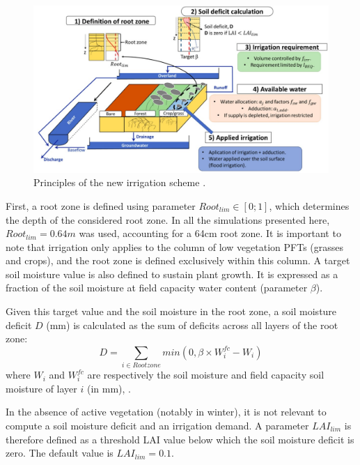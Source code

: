\begin{figure}[t]
    \centering
    \includegraphics[width=1\textwidth]{images/schema_pedro.png}
    \caption{Principles of the new irrigation scheme \citep[from][]{arboleda-obando_validation_2024}.}
    \label{fig:schema_pedro}
\end{figure}

First, a root zone is defined using parameter $Root_{lim} \in [0;1]$, which determines the depth of the considered root zone. In all the simulations presented here, $Root_{lim} = 0.64m$ was used, accounting for a 64cm root zone. It is important to note that irrigation only applies to the column of low vegetation PFTs (grasses and crops), and the root zone is defined exclusively within this column.%
A target soil moisture value is also defined to sustain plant growth. It is expressed as a fraction of the soil moisture at field capacity water content (parameter $\beta$).

Given this target value and the soil moisture in the root zone, a soil moisture deficit $D$ (mm) is calculated as the sum of deficits across all layers of the root zone:
\begin{equation}
    D = \sum_{i \in Rootzone} min(0,\beta \times W_i^{fc} - W_i)
\end{equation}
where $W_i$ and $W_i^{fc}$ are respectively the soil moisture and field capacity soil moisture of layer $i$ (in mm), .

In the absence of active vegetation (notably in winter), it is not relevant to compute a soil moisture deficit and an irrigation demand. A parameter $LAI_{lim}$ is therefore defined as a threshold LAI value below which the soil moisture deficit is zero. The default value is $LAI_{lim}=0.1$.

